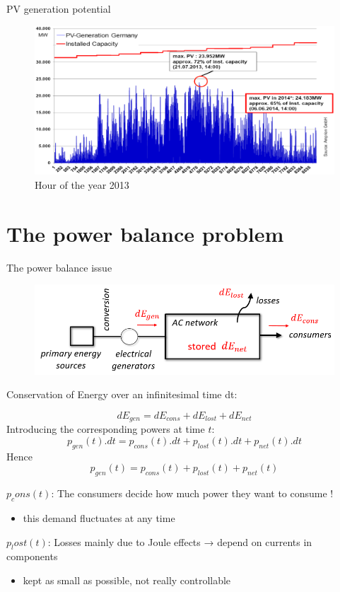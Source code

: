 \begin{frame}{PV generation potential}
\begin{figure}
\centering
\includegraphics[width=\linewidth]{images/PV_gen_DE.png}
\caption*{Hour of the year 2013}
\end{figure}
\end{frame}

\section{The power balance problem}


\begin{frame}
{The power balance issue}
\begin{figure}
\centering
\includegraphics[width=0.8\linewidth]{images/power_balance.png}
\end{figure}
Conservation of Energy over an infinitesimal time dt:

$$dE_{gen} = dE_{cons} + dE_{lost} + dE_{net}$$Introducing the corresponding powers at time $t$:$$p_{gen}(t).dt = p_{cons}(t).dt + p_{lost}(t).dt + p_{net}(t).dt$$Hence$$p_{gen}(t) = p_{cons}(t) + p_{lost}(t) + p_{net}(t)$$

\end{frame}

\begin{frame}
$p_cons(t)$: The consumers decide how much power they want to consume !
\begin{itemize}
\item this demand fluctuates at any time
\end{itemize}
$p_lost(t)$: Losses mainly due to Joule effects → depend on currents in components
\begin{itemize}
\item kept as small as possible, not really controllable
\end{itemize}
\end{frame}

